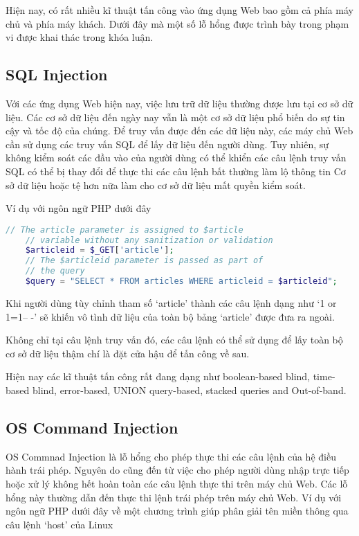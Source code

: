 \documentclass[./../main.tex]{subfiles}
\begin{document}
Hiện nay, có rất nhiều kĩ thuật tấn công vào ứng dụng Web bao gồm cả phía
máy chủ và phía máy khách. Dưới đây mà một số lỗ hổng được trình bày trong
phạm vi được khai thác trong khóa luận.

\subsection{SQL Injection}

Với các ứng dụng Web hiện nay, việc lưu trữ dữ liệu thường được lưu tại
cơ sở dữ liệu. Các cơ sở dữ liệu đến ngày nay vẫn là một cơ sở dữ liệu
phổ biến do sự tin cậy và tốc độ của chúng. Để truy vấn được đến các dữ
liệu này, các máy chủ Web cần sử dụng các truy vấn SQL để lấy dữ liệu đến
người dùng. Tuy nhiên, sự không kiểm soát các đầu vào của người dùng có
thể khiển các câu lệnh truy vấn SQL có thể bị thay đổi để thực thi các câu
lệnh bất thường làm lộ thông tin Cơ sở dữ liệu hoặc tệ hơn nữa làm cho cơ
sở dữ liệu mất quyền kiểm soát.

Ví dụ với ngôn ngữ PHP dưới đây
\begin{lstlisting}[language=php, caption=Lỗ hổng SQL Injection]
    // The article parameter is assigned to $article
    // variable without any sanitization or validation
    $articleid = $_GET['article'];
    // The $articleid parameter is passed as part of
    // the query
    $query = "SELECT * FROM articles WHERE articleid = $articleid";
\end{lstlisting}
Khi người dùng tùy chỉnh tham số `article' thành các câu lệnh dạng như
`1 or 1=1-- -' sẽ khiến vô tình dữ liệu của toàn bộ bảng `article' được
đưa ra ngoài.

Không chỉ tại câu lệnh truy vấn đó, các câu lệnh có thể sử dụng để lấy toàn
bộ cơ sở dữ liệu thậm chí là đặt cửa hậu để tấn công về sau.

Hiện nay các kĩ thuật tấn công rất đang dạng như boolean-based blind,
time-based blind, error-based, UNION query-based, stacked queries and
Out-of-band.

\subsection{OS Command Injection}
OS Commnad Injection là lỗ hổng cho phép thực thi các câu lệnh
của hệ điều hành trái phép. Nguyên do cũng đến từ việc cho phép người dùng
nhập trực tiếp hoặc xử lý không hết hoàn toàn các câu lệnh thực thi trên
máy chủ Web. Các lỗ hổng này thường dẫn đến thực thi lệnh trái phép trên
máy chủ Web.
Ví dụ với ngôn ngữ PHP dưới đây về một chương trình giúp phân giải tên miền
thông qua câu lệnh `host' của Linux
\end{document}
